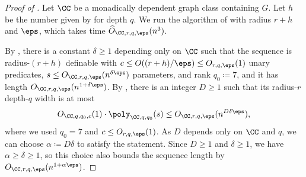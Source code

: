 \begin{proof}[Proof of ]
  Let $\CC$ be a monadically dependent graph class containing $G$.
  Let $h$ be the number given by  for depth $q$.
  We run the algorithm of  with radius $r+h$ and $\eps$, which takes time $\widehat O_{\CC,r,q,\eps}(n^3)$.

  By , there is a constant $\delta\ge1$ depending only on $\CC$ such that the sequence is radius-$(r+h)$ definable with $c\le O((r+h)/\eps)\le O_{r,q,\eps}(1)$ unary predicates, $s\le O_{\CC,r,q,\eps}(n^{\delta\eps})$ parameters, and rank $q_0\coloneqq7$,
  and it has length $O_{\CC,r,q,\eps}(n^{1+\delta\eps})$.
  By , there is an integer $D\ge1$ such that its radius-$r$ depth-$q$ width is at most
  \[
    O_{\CC,q,q_0,c}(1)\cdot\poly_{\CC,q,q_0}(s)\le O_{\CC,r,q,\eps}(n^{D\delta\eps}),
  \]
  where we used $q_0=7$ and $c\le O_{r,q,\eps}(1)$. As $D$ depends only on $\CC$ and $q$, we can choose $\alpha\coloneqq D\delta$ to satisfy the statement.
  Since $D\ge1$ and $\delta\ge1$, we have $\alpha\ge \delta\ge1$, so this choice also bounds the sequence length by $O_{\CC,r,q,\eps}(n^{1+\alpha\eps})$.
\end{proof}
